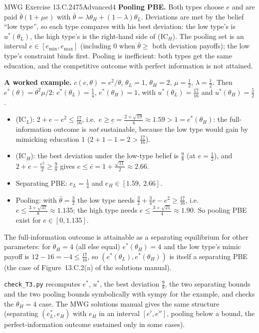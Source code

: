\begin{exsol}{MWG Exercise 13.C.2}{475}{Advanced}{4}
\textbf{Pooling PBE.} Both types choose $e$ and are paid $\bar\theta(1 + \mu e)$ with
$\bar\theta = \lambda\theta_H + (1-\lambda)\theta_L$. Deviations are met by the belief ``low type'', so each
type compares with his best deviation: the low type's is $u^*(\theta_L)$, the high type's is the right-hand side
of (IC$_H$). The pooling set is an interval $e \in [e_{\min}, e_{\max}]$ (including $0$ when
$\bar\theta \ge$ both deviation payoffs); the low type's constraint binds first. Pooling is
inefficient: both types get the same education, and the competitive outcome with perfect information is not
attained.

\textbf{A worked example.} $c(e, \theta) = e^2/\theta$, $\theta_L = 1$, $\theta_H = 2$, $\mu = \frac12$,
$\lambda = \frac12$. Then $e^*(\theta) = \theta^2\mu/2$: $e^*(\theta_L) = \frac14$, $e^*(\theta_H) = 1$, with $u^*(\theta_L) = \frac{17}{16}$ and
$u^*(\theta_H) = \frac52$.
\begin{itemize}
  \item (IC$_L$): $2 + e - e^2 \le \frac{17}{16}$, i.e.\ $e \ge \underline{e} = \frac{2 + \sqrt{19}}{4} \approx 1.59 > 1 = e^*(\theta_H)$:
  the full-information outcome is \emph{not} sustainable, because the low type would gain by
  mimicking education $1$ ($2 + 1 - 1 = 2 > \frac{17}{16}$).
  \item (IC$_H$): the best deviation under the low-type belief is $\frac98$ (at $e = \frac12$), and
  $2 + e - \frac{e^2}{2} \ge \frac98$ gives $e \le \bar e = 1 + \frac{\sqrt{11}}{2} \approx 2.66$.
  \item Separating PBE: $e_L = \frac14$ and $e_H \in [1.59,\ 2.66]$.
  \item Pooling: with $\bar\theta = \frac32$ the low type needs $\frac32 + \frac34 e - e^2 \ge \frac{17}{16}$, i.e.\
  $e \le \frac{3 + \sqrt{37}}{8} \approx 1.135$; the high type needs $e \le \frac{3 + \sqrt{21}}{4} \approx 1.90$.
  So pooling PBE exist for $e \in [0, 1.135]$.
\end{itemize}
The full-information outcome is attainable as a separating equilibrium for other parameters: for
$\theta_H = 4$ (all else equal) $e^*(\theta_H) = 4$ and the low type's mimic payoff is $12 - 16 = -4 \le
\frac{17}{16}$, so $(e^*(\theta_L), e^*(\theta_H))$ is itself a separating PBE (the case of Figure~13.C.2(a) of the solutions manual).

\verify \texttt{check\_T3.py} recomputes $e^*$, $u^*$, the best deviation $\frac98$, the two separating bounds
and the two pooling bounds symbolically with sympy for the example, and checks the $\theta_H = 4$ case. The
MWG solutions manual gives the same structure (separating $(e^*_L, e_H)$ with $e_H$ in an interval $[e', e'']$,
pooling below a bound, the perfect-information outcome sustained only in some cases).


\end{exsol}

